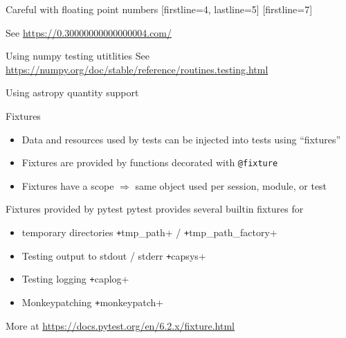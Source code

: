 \documentclass[
  aspectratio=1610,
]{beamer}
\begin{document}
\begin{frame}[c, fragile]{Careful with floating point numbers}
  [firstline=4, lastline=5]
  [firstline=7]

  See \url{https://0.30000000000000004.com/}
\end{frame}

\begin{frame}[c, fragile]{Using numpy testing utitlities}
  See \url{https://numpy.org/doc/stable/reference/routines.testing.html}
\end{frame}

\begin{frame}[c, fragile]{Using astropy quantity support}
\end{frame}

\begin{frame}[c]{Fixtures}
  \begin{itemize}
    \item Data and resources used by tests can be injected into tests using \enquote{fixtures}
    \item Fixtures are provided by functions decorated with \texttt{@fixture}
    \item Fixtures have a scope $⇒$ same object used per session, module, or test
  \end{itemize}

\end{frame}


\begin{frame}[c]{Fixtures provided by pytest}
  pytest provides several builtin fixtures for
  \begin{itemize}
    \item temporary directories \texttt+tmp_path+ / \texttt+tmp_path_factory+
    \item Testing output to stdout / stderr \texttt+capsys+
    \item Testing logging \texttt+caplog+
    \item Monkeypatching \texttt+monkeypatch+
  \end{itemize}
  More at \url{https://docs.pytest.org/en/6.2.x/fixture.html}
\end{frame}
\end{document}
